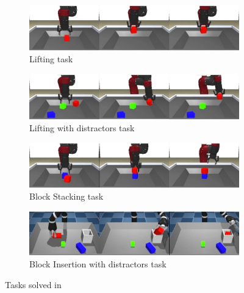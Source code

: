 \begin{figure}[t]
    \centering
    \begin{subfigure}[b]{0.6\textwidth}
        \centering
        \includegraphics[width=\textwidth]{figures/images/trail/block_lifting.png}
        \caption{Lifting task}
    \end{subfigure}
    \vfill
    \begin{subfigure}[b]{0.6\textwidth}
        \includegraphics[width=\textwidth]{figures/images/trail/block_lifting_with_distractors}
        \caption{Lifting with distractors task}
    \end{subfigure}
    \vfill
    \begin{subfigure}[b]{0.6\textwidth}
        \includegraphics[width=\textwidth]{figures/images/trail/block_stacking}
        \caption{Block Stacking task}
    \end{subfigure}
    \vfill
    \begin{subfigure}[b]{0.6\textwidth}
        \includegraphics[width=\textwidth]{figures/images/trail/block_insertion_with_distractors}
        \caption{Block Insertion with distractors task}
    \end{subfigure}
    \caption{Tasks solved in~\cite{zolna2021task_relevant_ail}}
    \label{fig:trail_tasks}
\end{figure}
